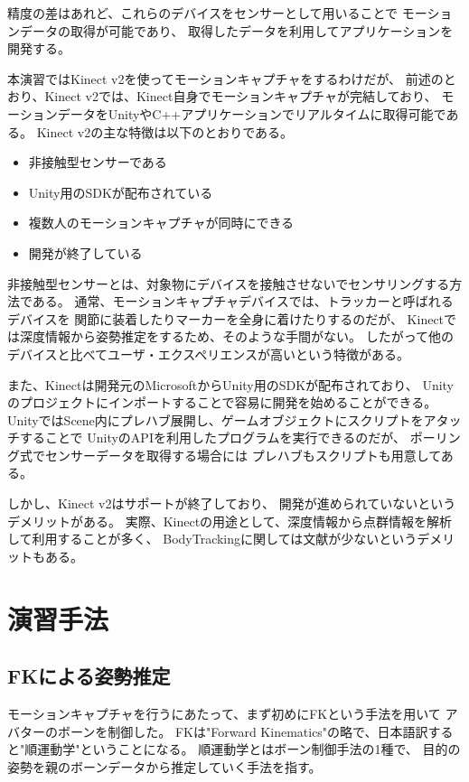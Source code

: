 \documentclass[a4j]{jsarticle}
\begin{document}
精度の差はあれど、これらのデバイスをセンサーとして用いることで
モーションデータの取得が可能であり、
取得したデータを利用してアプリケーションを開発する。

本演習ではKinect v2を使ってモーションキャプチャをするわけだが、
前述のとおり、Kinect v2では、Kinect自身でモーションキャプチャが完結しており、
モーションデータをUnityやC++アプリケーションでリアルタイムに取得可能である。
Kinect v2の主な特徴は以下のとおりである。

\begin{itemize}
  \item 非接触型センサーである
  \item Unity用のSDKが配布されている
  \item 複数人のモーションキャプチャが同時にできる
  \item 開発が終了している
\end{itemize}

非接触型センサーとは、対象物にデバイスを接触させないでセンサリングする方法である。
通常、モーションキャプチャデバイスでは、トラッカーと呼ばれるデバイスを
関節に装着したりマーカーを全身に着けたりするのだが、
Kinectでは深度情報から姿勢推定をするため、そのような手間がない。
したがって他のデバイスと比べてユーザ・エクスペリエンスが高いという特徴がある。

また、Kinectは開発元のMicrosoftからUnity用のSDKが配布されており、
Unityのプロジェクトにインポートすることで容易に開発を始めることができる。
UnityではScene内にプレハブ展開し、ゲームオブジェクトにスクリプトをアタッチすることで
UnityのAPIを利用したプログラムを実行できるのだが、
ポーリング式でセンサーデータを取得する場合には
プレハブもスクリプトも用意してある。

しかし、Kinect v2はサポートが終了しており、
開発が進められていないというデメリットがある。
実際、Kinectの用途として、深度情報から点群情報を解析して利用することが多く、
BodyTrackingに関しては文献が少ないというデメリットもある。

\section{演習手法}

\subsection{FKによる姿勢推定}

モーションキャプチャを行うにあたって、まず初めにFKという手法を用いて
アバターのボーンを制御した。
FKは"Forward Kinematics"の略で、日本語訳すると"順運動学"ということになる。
順運動学とはボーン制御手法の1種で、
目的の姿勢を親のボーンデータから推定していく手法を指す。
\end{document}
